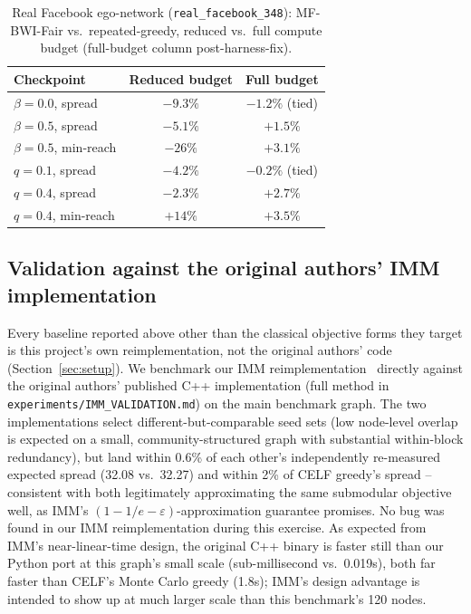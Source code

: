 \documentclass[journal]{IEEEtran}
\begin{document}
\begin{table}[t]
\centering
\caption{Real Facebook ego-network (\texttt{real\_facebook\_348}):
MF-BWI-Fair vs.\ repeated-greedy, reduced vs.\ full compute budget
(full-budget column post-harness-fix).}
\label{tab:realgraph}
\begin{tabular}{lcc}
\toprule
Checkpoint & Reduced budget & Full budget \\
\midrule
$\beta=0.0$, spread    & $-9.3\%$ & $-1.2\%$ (tied) \\
$\beta=0.5$, spread    & $-5.1\%$ & $\mathbf{+1.5\%}$ \\
$\beta=0.5$, min-reach & $-26\%$  & $\mathbf{+3.1\%}$ \\
$q=0.1$, spread        & $-4.2\%$ & $-0.2\%$ (tied) \\
$q=0.4$, spread        & $-2.3\%$ & $\mathbf{+2.7\%}$ \\
$q=0.4$, min-reach     & $+14\%$  & $\mathbf{+3.5\%}$ \\
\bottomrule
\end{tabular}
\end{table}

\subsection{Validation against the original authors' IMM implementation}
\label{sec:results-imm}

Every baseline reported above other than the classical objective forms
they target is this project's own reimplementation, not the original
authors' code (Section~\ref{sec:setup}). We benchmark our IMM
reimplementation~\cite{tang2015influence} directly against the original
authors' published C++ implementation (full method in
\texttt{experiments/IMM\_VALIDATION.md}) on the main benchmark graph. The
two implementations select different-but-comparable seed sets (low
node-level overlap is expected on a small, community-structured graph
with substantial within-block redundancy), but land within 0.6\% of each
other's independently re-measured expected spread (32.08 vs.\ 32.27) and
within 2\% of CELF greedy's spread -- consistent with both legitimately
approximating the same submodular objective well, as IMM's
$(1-1/e-\varepsilon)$-approximation guarantee promises. No bug was found
in our IMM reimplementation during this exercise. As expected from IMM's
near-linear-time design, the original C++ binary is faster still than
our Python port at this graph's small scale (sub-millisecond vs.\ 0.019s),
both far faster than CELF's Monte Carlo greedy (1.8s); IMM's design
advantage is intended to show up at much larger scale than this
benchmark's 120 nodes.
\end{document}
